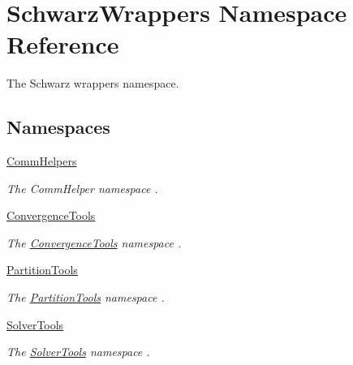 \hypertarget{namespaceSchwarzWrappers}{}\section{Schwarz\+Wrappers Namespace Reference}
\label{namespaceSchwarzWrappers}


The Schwarz wrappers namespace.  


\subsection*{Namespaces}
\begin{DoxyCompactItemize}
\item 
 \hyperlink{namespaceSchwarzWrappers_1_1CommHelpers}{Comm\+Helpers}
\begin{DoxyCompactList}\small\item\em The Comm\+Helper namespace . \end{DoxyCompactList}\item 
 \hyperlink{namespaceSchwarzWrappers_1_1ConvergenceTools}{Convergence\+Tools}
\begin{DoxyCompactList}\small\item\em The \hyperlink{namespaceSchwarzWrappers_1_1ConvergenceTools}{Convergence\+Tools} namespace . \end{DoxyCompactList}\item 
 \hyperlink{namespaceSchwarzWrappers_1_1PartitionTools}{Partition\+Tools}
\begin{DoxyCompactList}\small\item\em The \hyperlink{namespaceSchwarzWrappers_1_1PartitionTools}{Partition\+Tools} namespace . \end{DoxyCompactList}\item 
 \hyperlink{namespaceSchwarzWrappers_1_1SolverTools}{Solver\+Tools}
\begin{DoxyCompactList}\small\item\em The \hyperlink{namespaceSchwarzWrappers_1_1SolverTools}{Solver\+Tools} namespace . \end{DoxyCompactList}\end{DoxyCompactItemize}
